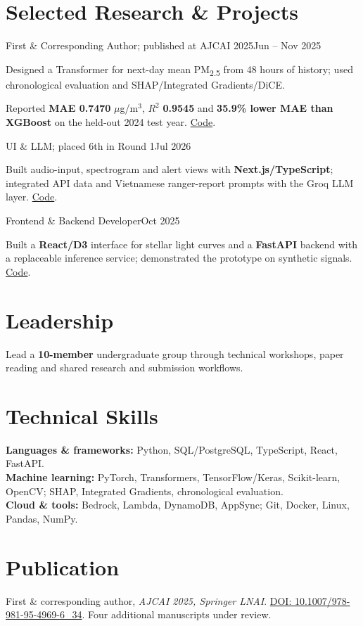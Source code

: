 \documentclass[11pt,a4paper]{article}
\begin{document}
\section{Selected Research \& Projects}
{First \& Corresponding Author; published at AJCAI 2025}{Jun -- Nov 2025}
\begin{highlights}
\item Designed a Transformer for next-day mean PM\textsubscript{2.5} from 48 hours of history; used chronological evaluation and SHAP/Integrated Gradients/DiCE.
\item Reported \textbf{MAE 0.7470} $\mu$g/m$^3$, $R^2$ \textbf{0.9545} and \textbf{35.9\% lower MAE than XGBoost} on the held-out 2024 test year. \href{https://github.com/SpeedyLabX/melbourne-air-quality-forecast}{Code}.
\end{highlights}
{UI \& LLM; placed 6th in Round 1}{Jul 2026}
\begin{highlights}
\item Built audio-input, spectrogram and alert views with \textbf{Next.js/TypeScript}; integrated API data and Vietnamese ranger-report prompts with the Groq LLM layer. \href{https://github.com/hei1sme/BioListen-VN}{Code}.
\end{highlights}
{Frontend \& Backend Developer}{Oct 2025}
\begin{highlights}
\item Built a \textbf{React/D3} interface for stellar light curves and a \textbf{FastAPI} backend with a replaceable inference service; demonstrated the prototype on synthetic signals. \href{https://github.com/hei1sme/cosmicoptic-webapp}{Code}.
\end{highlights}

\section{Leadership}
\begin{highlights}
\item Lead a \textbf{10-member} undergraduate group through technical workshops, paper reading and shared research and submission workflows.
\end{highlights}

\section{Technical Skills}
\textbf{Languages \& frameworks:} Python, SQL/PostgreSQL, TypeScript, React, FastAPI.\\
\textbf{Machine learning:} PyTorch, Transformers, TensorFlow/Keras, Scikit-learn, OpenCV; SHAP, Integrated Gradients, chronological evaluation.\\
\textbf{Cloud \& tools:} Bedrock, Lambda, DynamoDB, AppSync; Git, Docker, Linux, Pandas, NumPy.

\section{Publication}
First \& corresponding author, \textit{AJCAI 2025, Springer LNAI}.
\href{https://doi.org/10.1007/978-981-95-4969-6_34}{DOI: 10.1007/978-981-95-4969-6\_34}.
Four additional manuscripts under review.
\end{document}
